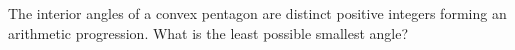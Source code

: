 The interior angles of a convex pentagon are distinct positive integers forming an arithmetic progression. What is the least possible smallest angle?
